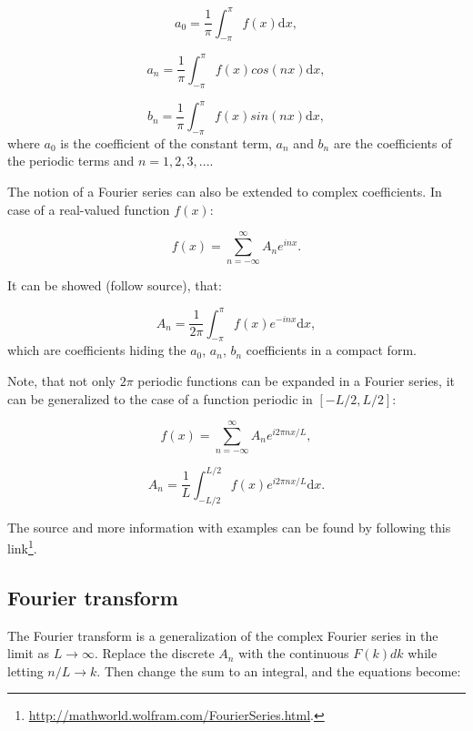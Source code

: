 \documentclass[12pt]{article}
\theoremstyle{plain}
\begin{document}
\begin{equation}
a_0 = \frac{1}{\pi} \int_{-\pi}^{\pi} f(x) \text{d}x,
\end{equation}

\begin{equation}
a_n = \frac{1}{\pi} \int_{-\pi}^{\pi} f(x) cos(nx) \text{d}x,
\end{equation}

\begin{equation}
b_n = \frac{1}{\pi} \int_{-\pi}^{\pi} f(x) sin(nx) \text{d}x,
\end{equation}
where $a_0$ is the coefficient of the constant term, $a_n$ and $b_n$ are the coefficients of the periodic terms and $n=1,2,3, ...$.

The notion of a Fourier series can also be extended to complex coefficients. In case of a real-valued function $f(x)$:

\begin{equation}
f(x) = \sum_{n=-\infty}^{\infty} A_n e^{i n x}.
\end{equation}

It can be showed (follow source), that:

\begin{equation}
A_n = \frac{1}{2 \pi} \int_{-\pi}^{\pi} f(x) e^{-i n x} \text{d}x,
\end{equation}
which are coefficients hiding the $a_0$, $a_n$, $b_n$ coefficients in a compact form.

Note, that not only $2 \pi$ periodic functions can be expanded in a Fourier series, it can be generalized to the case of a function periodic in $[-L/2, L/2]$:

\begin{equation}
f(x) = \sum_{n=-\infty}^{\infty} A_n e^{i 2 \pi n x/L},
\end{equation}

\begin{equation}
A_n = \frac{1}{L} \int_{-L/2}^{L/2} f(x) e^{i 2 \pi n x/L} \text{d}x.
\end{equation}

The source and more information with examples can be found by following this link\footnote{\url{http://mathworld.wolfram.com/FourierSeries.html}.}. 

\subsection{Fourier transform}

The Fourier transform is a generalization of the complex Fourier series in the limit as $L \rightarrow	\infty$. Replace the discrete $A_n$ with the continuous $F(k)dk$ while letting  $n/L \rightarrow k$. Then change the sum to an integral, and the equations become:
\end{document}
